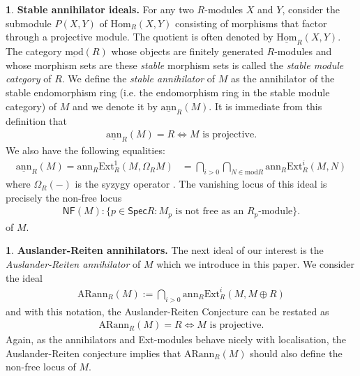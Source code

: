 \documentclass[12pt]{amsart}
\newcommand{\Ext}{\mathrm{Ext}}
\newcommand{\Hom}{\mathrm{Hom}}
\newcommand{\sHom}{\underline{\mathrm{Hom}}}
\newcommand{\ann}{\mathrm{ann}}
\newcommand{\sann}{\underline{\mathrm{ann}}}
\newcommand{\arann}{\mathrm{ARann}}
\newcommand{\module}{\mathrm{mod}}
\newcommand{\spec}{\mathsf{Spec}}
\theoremstyle{definition}
\newtheorem{chunk}[theorem]{}
\numberwithin{equation}{theorem}
\newcommand{\nf}{\mathsf{NF}}
\begin{document}
\begin{chunk}
    \textbf{Stable annihilator ideals.}
For any two $R$-modules $X$ and $Y$, consider the submodule $P(X,Y)$ of $\Hom_R(X,Y)$ consisting of morphisms that factor through a projective module. The quotient is often denoted by $\sHom_R(X,Y)$. The category $\underline{\module}(R)$ whose objects are finitely generated $R$-modules and whose morphism sets are these \textit{stable} morphism sets is called the \textit{stable module category} of $R$. We define the \textit{stable annihilator} of $M$ as the annihilator of the stable endomorphism ring (i.e. the endomorphism ring in the stable module category) of $M$ and we denote it by $\sann_R (M)$. It is immediate from this definition that 
    \begin{align}\label{stable-annihilator-of-a-projective}
        \sann_R(M) = R \iff M \text{ is projective}.
    \end{align}
    We also have the following equalities:
    \begin{align*}
        \sann_R(M) = \ann_R \Ext_R^1(M, \Omega_R M) & = \bigcap_{i > 0 } \bigcap_{N \in \module R} \ann_R \Ext_R^i(M,N)
    \end{align*}
    where $\Omega_R(-)$ is the syzygy operator \cite[Lemma 2.2]{Dao-Kobayashi-Takahashi}. The vanishing locus of this ideal is precisely the non-free locus 
    \begin{align*}
        \nf(M) \colon \{ p \in \spec R \colon M_p \text{ is not free as an } R_p\text{-module}\}.
        \end{align*}
    of $M$.
\end{chunk}


\begin{chunk}
    \textbf{Auslander-Reiten annihilators.} The next ideal of our interest is the \textit{Auslander-Reiten annihilator} of $M$ which we introduce in this paper. We consider the ideal
    \begin{align*}
        \arann_R(M) := \bigcap_{i > 0}  \ann_R \Ext_R^i(M, M \oplus R)
    \end{align*}
    and with this notation, the Auslander-Reiten Conjecture can be restated as 
    \begin{align}\label{ar-annihilator-of-a-projective}
        \arann_R(M) = R \iff M \text{ is projective}.
    \end{align}
    Again, as the annihilators and Ext-modules behave nicely with localisation, the Auslander-Reiten conjecture implies that $\arann_R(M)$ should also define the non-free locus of $M$.
\end{chunk}
\end{document}
